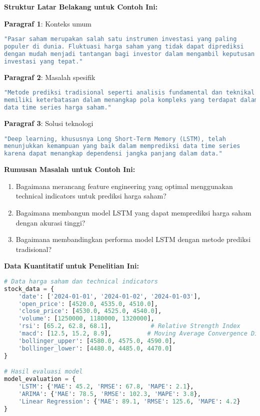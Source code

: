 \textbf{Struktur Latar Belakang untuk Contoh Ini:}

\textbf{Paragraf 1}: Konteks umum
\begin{lstlisting}[language=bash, style=bash, caption=Latar Belakang Penelitian Prediksi Saham]
"Pasar saham merupakan salah satu instrumen investasi yang paling
populer di dunia. Fluktuasi harga saham yang tidak dapat diprediksi
dengan mudah menjadi tantangan bagi investor dalam mengambil keputusan
investasi yang tepat."
\end{lstlisting}

\textbf{Paragraf 2}: Masalah spesifik
\begin{lstlisting}[language=bash, style=bash, caption=Identifikasi Masalah Spesifik]
"Metode prediksi tradisional seperti analisis fundamental dan teknikal
memiliki keterbatasan dalam menangkap pola kompleks yang terdapat dalam
data time series harga saham."
\end{lstlisting}

\textbf{Paragraf 3}: Solusi teknologi
\begin{lstlisting}[language=bash, style=bash, caption=Solusi yang Diusulkan]
"Deep learning, khususnya Long Short-Term Memory (LSTM), telah
menunjukkan kemampuan yang baik dalam memprediksi data time series
karena dapat menangkap dependensi jangka panjang dalam data."
\end{lstlisting}

\textbf{Rumusan Masalah untuk Contoh Ini:}
\begin{enumerate}
    \item Bagaimana merancang feature engineering yang optimal menggunakan technical indicators untuk prediksi harga saham?
    \item Bagaimana membangun model LSTM yang dapat memprediksi harga saham dengan akurasi tinggi?
    \item Bagaimana membandingkan performa model LSTM dengan metode prediksi tradisional?
\end{enumerate}

\textbf{Data Kuantitatif untuk Penelitian Ini:}
\begin{lstlisting}[language=python, style=python, caption=Contoh Data Kuantitatif Prediksi Saham]
# Data harga saham dan technical indicators
stock_data = {
    'date': ['2024-01-01', '2024-01-02', '2024-01-03'],
    'open_price': [4520.0, 4535.0, 4510.0],
    'close_price': [4530.0, 4525.0, 4540.0],
    'volume': [1250000, 1180000, 1320000],
    'rsi': [65.2, 62.8, 68.1],           # Relative Strength Index
    'macd': [12.5, 15.2, 8.9],          # Moving Average Convergence Divergence
    'bollinger_upper': [4580.0, 4575.0, 4590.0],
    'bollinger_lower': [4480.0, 4485.0, 4470.0]
}

# Hasil evaluasi model
model_evaluation = {
    'LSTM': {'MAE': 45.2, 'RMSE': 67.8, 'MAPE': 2.1},
    'ARIMA': {'MAE': 78.5, 'RMSE': 102.3, 'MAPE': 3.8},
    'Linear Regression': {'MAE': 89.1, 'RMSE': 125.6, 'MAPE': 4.2}
}
\end{lstlisting}

